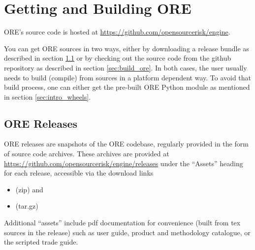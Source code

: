 \section{Getting and Building ORE}\label{sec:installation}

ORE's source code is hosted at \url{https://github.com/opensourcerisk/engine}.

You can get ORE sources in two ways, either by downloading a release bundle as described in section \ref{sec:release}
or by checking out the source code from the github repository as described in section \ref{sec:build_ore}.
In both cases, the user usually needs to build (compile) from sources in a platform dependent way.
To avoid that build process, one can either get the pre-built ORE Python module as mentioned in section \ref{sec:intro_wheels}.

\subsection{ORE Releases}\label{sec:release}

ORE releases are snapshots of the ORE codebase, regularly provided in the form of source code archives.
These archives are provided at \url{https://github.com/opensourcerisk/engine/releases} under the ``Assets'' heading
for each release, accessible via the download links
\begin{itemize}
\item {\color{blue}{\bf Source code} (zip)} and
\item {\color{blue}{\bf Source code} (tar.gz)}
\end{itemize}
Additional ``assets'' include pdf documentation for convenience (built from tex sources in the release) such as user guide,
product and methodology catalogue, or the scripted trade guide.

